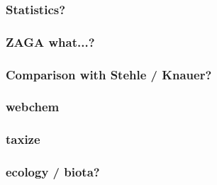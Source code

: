 \documentclass[10pt
	]{beamer}
\begin{document}
\appendix

\begin{frame}
\frametitle{Statistics?}

\end{frame}


\begin{frame}
\frametitle{ZAGA what...?}

\end{frame}


\begin{frame}
\frametitle{Comparison with Stehle / Knauer?}

\end{frame}


\begin{frame}
\frametitle{webchem}

\end{frame}


\begin{frame}
\frametitle{taxize}

\end{frame}


\begin{frame}
\frametitle{ecology / biota?}

\end{frame}


\end{document}
